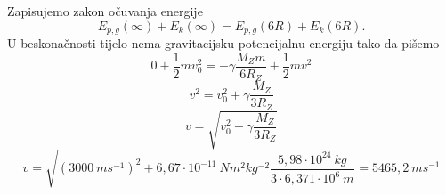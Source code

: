 
Zapisujemo zakon očuvanja energije
$$  E_{p,g}(\infty) +  E_k(\infty) = E_{p,g}(6R) +  E_k(6R). $$
U beskonačnosti tijelo nema gravitacijsku potencijalnu energiju tako da pišemo
$$ 0 + \frac{1}{2}mv_0^2 = -\gamma \frac{M_Zm}{6R_Z} + \frac{1}{2}mv^2$$
$$ v^2= v_0^2 + \gamma \frac{M_Z}{3R_Z}$$
$$ v = \sqrt{v_0^2 + \gamma \frac{M_Z}{3R_Z}}$$
$$ v = \sqrt{(3000\ ms^{-1})^2  + 6,67\cdot  10^{-11}\ Nm^2kg^{-2} 
\frac{5,98 \cdot  10^{24}\ kg}{3\cdot 6,371 \cdot 10^6\ m}}=5465,2\ ms^{-1} $$
